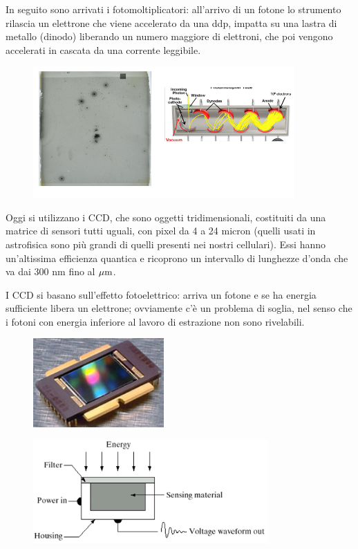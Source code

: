 In seguito sono arrivati i fotomoltiplicatori: all'arrivo di un fotone lo strumento rilascia un elettrone che viene accelerato da una ddp, impatta su una lastra di metallo (dinodo) liberando un numero maggiore di elettroni, che poi vengono accelerati in cascata da una corrente leggibile.

\begin{figure}[H]
   \centering
   \includegraphics[width=10cm]{astro2.png}
\end{figure}

Oggi si utilizzano i CCD, che sono oggetti tridimensionali, costituiti da una matrice di sensori tutti uguali, con pixel da 4 a 24 micron (quelli usati in astrofisica sono più grandi di quelli presenti nei nostri cellulari). Essi hanno un'altissima efficienza quantica e ricoprono un intervallo di lunghezze d'onda che va dai 300 nm fino al $\rm \mu m$.

I CCD si basano sull'effetto fotoelettrico: arriva un fotone e se ha energia sufficiente libera un elettrone; ovviamente c'è un problema di soglia, nel senso che i fotoni con energia inferiore al lavoro di estrazione non sono rivelabili.

\begin{minipage}{0.4\textwidth}
   \begin{figure}[H]
      \centering
      \includegraphics[width=5cm]{astro3.png}
   \end{figure}
\end{minipage}
\begin{minipage}{0.6\textwidth}
   \begin{figure}[H]
      \centering
      \includegraphics[width=9cm]{astro4.png}
   \end{figure}
\end{minipage}

